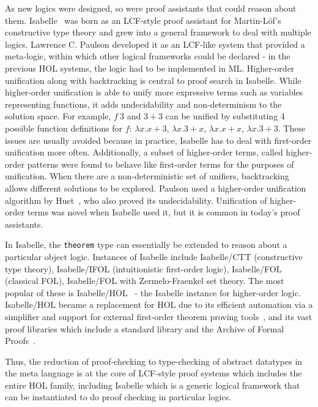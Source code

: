 \documentclass{article}
\begin{document}
	As new logics
	were designed, so were proof 
	assistants that could reason about 
	them. 
	Isabelle~\cite{10.1007/978-3-540-71067-7_7}
	was born as an 
	LCF-style proof assistant for 
	Martin-L\"{o}f's constructive type 
	theory and grew into a general 
	framework to deal with multiple 
	logics. Lawrence C. Paulson 
	developed it as an LCF-like
	system that provided a meta-logic, 
	within which other logical frameworks 
	could be declared - in the previous 
	HOL systems, the logic had to be 
	implemented in ML. Higher-order
	unification along with backtracking
	is central to proof search in Isabelle. 
	While higher-order unification 
	is able to unify more expressive 
	terms such as variables 
	representing functions, it adds 
	undecidability and non-determinism 
	to the solution space. For example, 
	$f\ 3$ and $3+3$ can be unified 
	by substituting 4 possible function 
	definitions for $f$: 
	$\lambda x.x+3$, $\lambda x.3+x$, 
	$\lambda x.x+x$, $\lambda x.3+3$.
	These issues are usually avoided 
	because in practice, Isabelle 
	has to deal with first-order 
	unification more often. Additionally, 
	a subset of higher-order terms, 
	called higher-order patterns were 
	found to behave like first-order 
	terms for the purposes of unification.
	When there are a non-deterministic 
	set of unifiers, backtracking allows
	different solutions to be explored.
	Paulson used a higher-order 
	unification algorithm by 
	Huet~\cite{HUET197527}, who 
	also proved its undecidability. 
	Unification of higher-order terms
	was novel when Isabelle used it, 
	but it is common in today's 
	proof assistants.
	
	In Isabelle, the \texttt{theorem}
	type can essentially be extended to 
	reason about a particular object logic. 
	Instances of Isabelle include 
	Isabelle/CTT (constructive type theory),
	Isabelle/IFOL (intuitionistic first-order 
	logic), Isabelle/FOL (classical FOL), 
	Isabelle/FOL with Zermelo-Fraenkel 
	set theory. The most popular of these
	is Isabelle/HOL~\cite{10.5555/1791547} 
	- the Isabelle
	instance for higher-order logic.
	Isabelle/HOL became a replacement for 
	HOL due to its efficient automation 
	via a simplifier and support for 
	external first-order theorem proving 
	tools~\cite
	{10.1007/978-3-540-25984-8_28}, and 
	its vast proof libraries which include 
	a standard library and the 
	Archive of Formal Proofs~\cite{afp}. 
	
	Thus, the reduction of proof-checking
	to type-checking of abstract datatypes
	in the meta language is at the core 
	of LCF-style proof systems which 
	includes the entire HOL family, 
	including Isabelle which is a 
	generic logical framework that 
	can be instantiated to do proof
	checking in particular logics.
	
\end{document}
